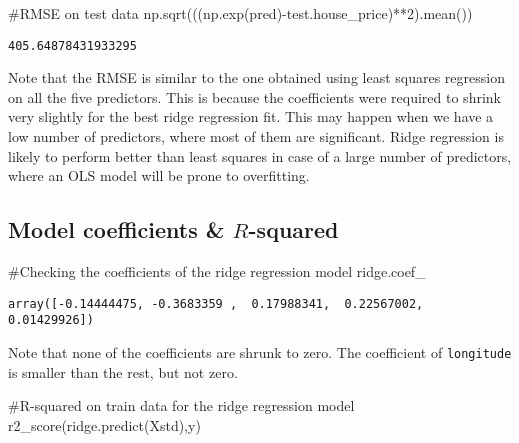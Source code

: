 \documentclass[
  letterpaper,
  DIV=11,
  numbers=noendperiod]{scrreprt}
\newenvironment{Shaded}{\begin{snugshade}}{\end{snugshade}}
\newcommand{\CommentTok}[1]{\textcolor[rgb]{0.37,0.37,0.37}{#1}}
\newcommand{\DecValTok}[1]{\textcolor[rgb]{0.68,0.00,0.00}{#1}}
\newcommand{\NormalTok}[1]{\textcolor[rgb]{0.00,0.23,0.31}{#1}}
\newcommand{\OperatorTok}[1]{\textcolor[rgb]{0.37,0.37,0.37}{#1}}
\begin{document}
\begin{Shaded}
\begin{Highlighting}[]
\CommentTok{\#RMSE on test data}
\NormalTok{np.sqrt(((np.exp(pred)}\OperatorTok{{-}}\NormalTok{test.house\_price)}\OperatorTok{**}\DecValTok{2}\NormalTok{).mean())}
\end{Highlighting}
\end{Shaded}

\begin{verbatim}
405.64878431933295
\end{verbatim}

Note that the RMSE is similar to the one obtained using least squares
regression on all the five predictors. This is because the coefficients
were required to shrink very slightly for the best ridge regression fit.
This may happen when we have a low number of predictors, where most of
them are significant. Ridge regression is likely to perform better than
least squares in case of a large number of predictors, where an OLS
model will be prone to overfitting.

\subsection{\texorpdfstring{Model coefficients \&
\(R\)-squared}{Model coefficients \& R-squared}}\label{model-coefficients-r-squared}

\begin{Shaded}
\begin{Highlighting}[]
\CommentTok{\#Checking the coefficients of the ridge regression model}
\NormalTok{ridge.coef\_}
\end{Highlighting}
\end{Shaded}

\begin{verbatim}
array([-0.14444475, -0.3683359 ,  0.17988341,  0.22567002,  0.01429926])
\end{verbatim}

Note that none of the coefficients are shrunk to zero. The coefficient
of \texttt{longitude} is smaller than the rest, but not zero.

\begin{Shaded}
\begin{Highlighting}[]
\CommentTok{\#R{-}squared on train data for the ridge regression model}
\NormalTok{r2\_score(ridge.predict(Xstd),y)}
\end{Highlighting}
\end{Shaded}
\end{document}
